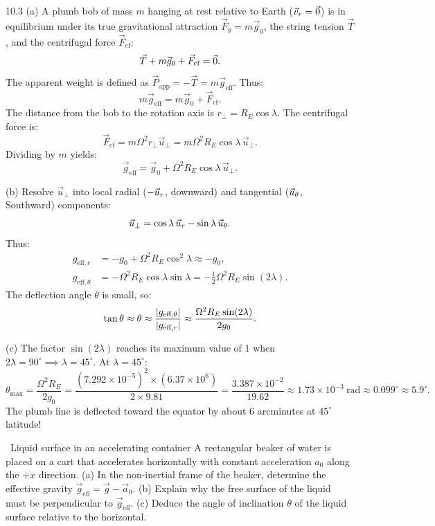 \begin{tabletworkspace}[6.0cm]
\end{tabletworkspace}

\begin{solution}{10.3}
(a) A plumb bob of mass $m$ hanging at rest relative to Earth ($\vec{v}_r = \vec{0}$) is in equilibrium under its true gravitational attraction $\vec{F}_g = m\vec{g}_0$, the string tension $\vec{T}$, and the centrifugal force $\vec{F}_{\text{cf}}$:
\[
\vec{T} + m\vec{g}_0 + \vec{F}_{\text{cf}} = \vec{0}.
\]
The apparent weight is defined as $\vec{P}_{\text{app}} = -\vec{T} = m\vec{g}_{\text{eff}}$. Thus:
\[
m\vec{g}_{\text{eff}} = m\vec{g}_0 + \vec{F}_{\text{cf}}.
\]
The distance from the bob to the rotation axis is $r_\perp = R_E\cos\lambda$. The centrifugal force is:
\[
\vec{F}_{\text{cf}} = m\Omega^2 r_\perp\vec{u}_\perp = m\Omega^2 R_E\cos\lambda\,\vec{u}_\perp.
\]
Dividing by $m$ yields:
\[
\vec{g}_{\text{eff}} = \vec{g}_0 + \Omega^2 R_E\cos\lambda\,\vec{u}_\perp.
\]

(b) Resolve $\vec{u}_\perp$ into local radial ($-\vec{u}_r$, downward) and tangential ($\vec{u}_\theta$, Southward) components:
\[
\vec{u}_\perp = \cos\lambda\,\vec{u}_r - \sin\lambda\,\vec{u}_\theta.
\]
Thus:
\begin{align*}
g_{\text{eff}, r} &= -g_0 + \Omega^2 R_E\cos^2\lambda \approx -g_0, \\
g_{\text{eff}, \theta} &= -\Omega^2 R_E\cos\lambda\sin\lambda = -\frac{1}{2}\Omega^2 R_E\sin(2\lambda).
\end{align*}
The deflection angle $\theta$ is small, so:
\[
\tan\theta \approx \theta \approx \frac{\left\lvert g_{\text{eff}, \theta} \right\rvert}{\left\lvert g_{\text{eff}, r} \right\rvert} \approx \frac{\Omega^2 R_E\sin(2\lambda)}{2g_0}.
\]

(c) The factor $\sin(2\lambda)$ reaches its maximum value of $1$ when $2\lambda = 90^\circ \implies \lambda = 45^\circ$.
At $\lambda = 45^\circ$:
\[
\theta_{\max} = \frac{\Omega^2 R_E}{2g_0} = \frac{(7.292\times 10^{-5})^2\times(6.37\times 10^6)}{2\times 9.81} = \frac{3.387\times 10^{-2}}{19.62} \approx 1.73\times 10^{-3}\ \mathrm{rad} \approx 0.099^\circ \approx 5.9'.
\]
The plumb line is deflected toward the equator by about $6$ arcminutes at $45^\circ$ latitude!
\end{solution}

\begin{exercise}{\core\ Liquid surface in an accelerating container}
A rectangular beaker of water is placed on a cart that accelerates horizontally with constant acceleration $a_0$ along the $+x$ direction.
(a) In the non-inertial frame of the beaker, determine the effective gravity $\vec{g}_{\text{eff}} = \vec{g} - \vec{a}_0$.
(b) Explain why the free surface of the liquid must be perpendicular to $\vec{g}_{\text{eff}}$.
(c) Deduce the angle of inclination $\theta$ of the liquid surface relative to the horizontal.
\end{exercise}

